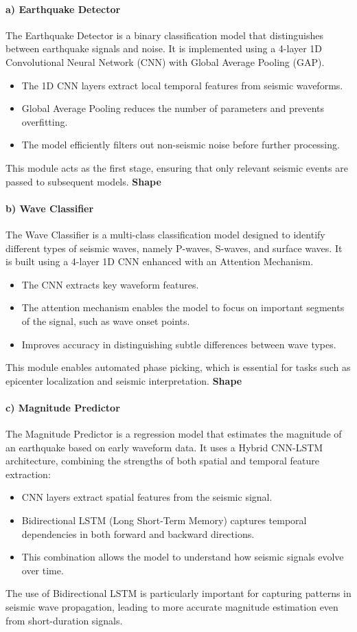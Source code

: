 \documentclass[a4paper,12pt]{report}
\begin{document}
\paragraph{a) Earthquake Detector}
The Earthquake Detector is a binary classification model that distinguishes between earthquake signals and noise. It is implemented using a 4-layer 1D Convolutional Neural Network (CNN) with Global Average Pooling (GAP).
\begin{itemize}
\item The 1D CNN layers extract local temporal features from seismic waveforms.
\item Global Average Pooling reduces the number of parameters and prevents overfitting.
\item The model efficiently filters out non-seismic noise before further processing.
\end{itemize}
This module acts as the first stage, ensuring that only relevant seismic events are passed to subsequent models.
\textbf{Shape}

\paragraph{b) Wave Classifier}
The Wave Classifier is a multi-class classification model designed to identify different types of seismic waves, namely P-waves, S-waves, and surface waves. It is built using a 4-layer 1D CNN enhanced with an Attention Mechanism.
\begin{itemize}
\item The CNN extracts key waveform features.
\item The attention mechanism enables the model to focus on important segments of the signal, such as wave onset points.
\item Improves accuracy in distinguishing subtle differences between wave types.
\end{itemize}
This module enables automated phase picking, which is essential for tasks such as epicenter localization and seismic interpretation.
\textbf{Shape}

\paragraph{c) Magnitude Predictor}
The Magnitude Predictor is a regression model that estimates the magnitude of an earthquake based on early waveform data. It uses a Hybrid CNN-LSTM architecture, combining the strengths of both spatial and temporal feature extraction:
\begin{itemize}
\item CNN layers extract spatial features from the seismic signal.
\item Bidirectional LSTM (Long Short-Term Memory) captures temporal dependencies in both forward and backward directions.
\item This combination allows the model to understand how seismic signals evolve over time.
\end{itemize}
The use of Bidirectional LSTM is particularly important for capturing patterns in seismic wave propagation, leading to more accurate magnitude estimation even from short-duration signals.
\end{document}
